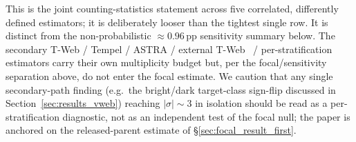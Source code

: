 \documentclass[twocolumn,linenumbers]{aastex702}
\begin{document}
This is the joint counting-statistics statement across five correlated,
differently defined estimators; it is deliberately looser than the
tightest single row. It is distinct from the non-probabilistic
${\approx}0.96$\,pp sensitivity summary below. The secondary T-Web / Tempel / ASTRA
/ external T-Web~\cite{TWebDESI2026} / per-stratification estimators carry their own multiplicity
budget but, per the focal/sensitivity separation above, do not enter
the focal estimate. We caution that any single secondary-path
finding (e.g.\ the bright/dark target-class sign-flip discussed in
Section~\ref{sec:results_vweb}) reaching $|\sigma| \sim 3$ in
isolation should be read as a per-stratification diagnostic, not as
an independent test of the focal null; the paper is anchored on the
released-parent estimate of \S\ref{sec:focal_result_first}.
\end{document}
